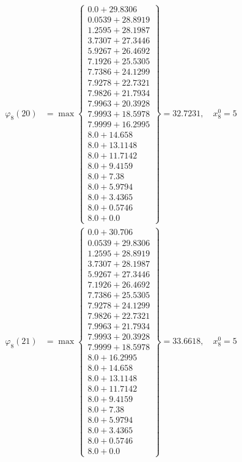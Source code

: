 \documentclass{article}
\begin{document}
\begin{align*}
\varphi_{8}(20) &= \max \left\{ \begin{array}{c}
0.0 + 29.8306 \\
 0.0539 + 28.8919 \\
 1.2595 + 28.1987 \\
 3.7307 + 27.3446 \\
 5.9267 + 26.4692 \\
 7.1926 + 25.5305 \\
 7.7386 + 24.1299 \\
 7.9278 + 22.7321 \\
 7.9826 + 21.7934 \\
 7.9963 + 20.3928 \\
 7.9993 + 18.5978 \\
 7.9999 + 16.2995 \\
 8.0 + 14.658 \\
 8.0 + 13.1148 \\
 8.0 + 11.7142 \\
 8.0 + 9.4159 \\
 8.0 + 7.38 \\
 8.0 + 5.9794 \\
 8.0 + 3.4365 \\
 8.0 + 0.5746 \\
 8.0 + 0.0
\end{array} \right\}=32.7231, \quad x_{8}^0=5\\
  
\varphi_{8}(21) &= \max \left\{ \begin{array}{c}
0.0 + 30.706 \\
 0.0539 + 29.8306 \\
 1.2595 + 28.8919 \\
 3.7307 + 28.1987 \\
 5.9267 + 27.3446 \\
 7.1926 + 26.4692 \\
 7.7386 + 25.5305 \\
 7.9278 + 24.1299 \\
 7.9826 + 22.7321 \\
 7.9963 + 21.7934 \\
 7.9993 + 20.3928 \\
 7.9999 + 18.5978 \\
 8.0 + 16.2995 \\
 8.0 + 14.658 \\
 8.0 + 13.1148 \\
 8.0 + 11.7142 \\
 8.0 + 9.4159 \\
 8.0 + 7.38 \\
 8.0 + 5.9794 \\
 8.0 + 3.4365 \\
 8.0 + 0.5746 \\
 8.0 + 0.0
\end{array} \right\}=33.6618, \quad x_{8}^0=5\\
  

\end{align*}
\end{document}
